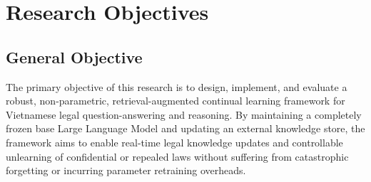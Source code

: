\section{Research Objectives}

\subsection{General Objective}
The primary objective of this research is to design, implement, and evaluate a robust, non-parametric, retrieval-augmented continual learning framework for Vietnamese legal question-answering and reasoning. By maintaining a completely frozen base Large Language Model and updating an external knowledge store, the framework aims to enable real-time legal knowledge updates and controllable unlearning of confidential or repealed laws without suffering from catastrophic forgetting or incurring parameter retraining overheads.

